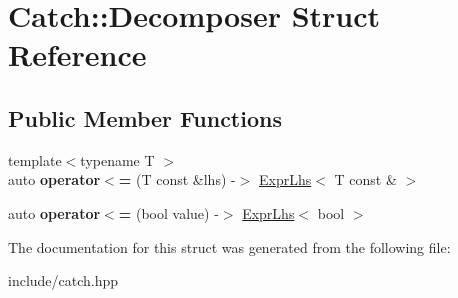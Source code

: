 \hypertarget{structCatch_1_1Decomposer}{}\section{Catch\+:\+:Decomposer Struct Reference}
\label{structCatch_1_1Decomposer}
\subsection*{Public Member Functions}
\begin{DoxyCompactItemize}
\item 
{\footnotesize template$<$typename T $>$ }\\auto {\bfseries operator$<$=} (T const \&lhs) -\/$>$ \hyperlink{classCatch_1_1ExprLhs}{Expr\+Lhs}$<$ T const \& $>$\hypertarget{structCatch_1_1Decomposer_a4b1e5e844c20e5a90e3d759d216674cd}{}\label{structCatch_1_1Decomposer_a4b1e5e844c20e5a90e3d759d216674cd}

\item 
auto {\bfseries operator$<$=} (bool value) -\/$>$ \hyperlink{classCatch_1_1ExprLhs}{Expr\+Lhs}$<$ bool $>$\hypertarget{structCatch_1_1Decomposer_aac129b94903ae1339d5709049d83613b}{}\label{structCatch_1_1Decomposer_aac129b94903ae1339d5709049d83613b}

\end{DoxyCompactItemize}


The documentation for this struct was generated from the following file\+:\begin{DoxyCompactItemize}
\item 
include/catch.\+hpp\end{DoxyCompactItemize}
